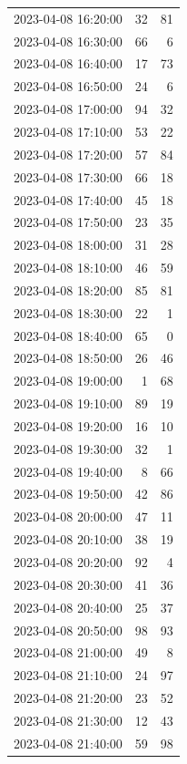 \documentclass[
  letterpaper,
  DIV=11,
  numbers=noendperiod]{scrartcl}
\begin{document}
\begin{tabular}{lrr}
2023-04-08 16:20:00 &    32 &    81 \\
2023-04-08 16:30:00 &    66 &     6 \\
2023-04-08 16:40:00 &    17 &    73 \\
2023-04-08 16:50:00 &    24 &     6 \\
2023-04-08 17:00:00 &    94 &    32 \\
2023-04-08 17:10:00 &    53 &    22 \\
2023-04-08 17:20:00 &    57 &    84 \\
2023-04-08 17:30:00 &    66 &    18 \\
2023-04-08 17:40:00 &    45 &    18 \\
2023-04-08 17:50:00 &    23 &    35 \\
2023-04-08 18:00:00 &    31 &    28 \\
2023-04-08 18:10:00 &    46 &    59 \\
2023-04-08 18:20:00 &    85 &    81 \\
2023-04-08 18:30:00 &    22 &     1 \\
2023-04-08 18:40:00 &    65 &     0 \\
2023-04-08 18:50:00 &    26 &    46 \\
2023-04-08 19:00:00 &     1 &    68 \\
2023-04-08 19:10:00 &    89 &    19 \\
2023-04-08 19:20:00 &    16 &    10 \\
2023-04-08 19:30:00 &    32 &     1 \\
2023-04-08 19:40:00 &     8 &    66 \\
2023-04-08 19:50:00 &    42 &    86 \\
2023-04-08 20:00:00 &    47 &    11 \\
2023-04-08 20:10:00 &    38 &    19 \\
2023-04-08 20:20:00 &    92 &     4 \\
2023-04-08 20:30:00 &    41 &    36 \\
2023-04-08 20:40:00 &    25 &    37 \\
2023-04-08 20:50:00 &    98 &    93 \\
2023-04-08 21:00:00 &    49 &     8 \\
2023-04-08 21:10:00 &    24 &    97 \\
2023-04-08 21:20:00 &    23 &    52 \\
2023-04-08 21:30:00 &    12 &    43 \\
2023-04-08 21:40:00 &    59 &    98 \\

\end{tabular}
\end{document}

